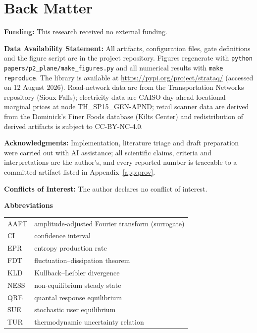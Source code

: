 \section*{Back Matter}
\small
\noindent\textbf{Funding:} This research received no external funding.

\noindent\textbf{Data Availability Statement:} All artifacts, configuration files, gate
definitions and the figure script are in the project repository. Figures regenerate with
\texttt{python papers/p2\_plane/make\_figures.py} and all numerical results with
\texttt{make reproduce}. The library is available at
\url{https://pypi.org/project/strataq/} (accessed on 12 August 2026). Road-network data are
from the Transportation Networks repository (Sioux Falls); electricity data are CAISO
day-ahead locational marginal prices at node TH\_SP15\_GEN-APND; retail scanner data are
derived from the Dominick's Finer Foods database (Kilts Center) and redistribution of
derived artifacts is subject to CC-BY-NC-4.0.

\noindent\textbf{Acknowledgments:} Implementation, literature triage and draft preparation
were carried out with AI assistance; all scientific claims, criteria and interpretations are
the author's, and every reported number is traceable to a committed artifact listed in
Appendix~\ref{app:prov}.

\noindent\textbf{Conflicts of Interest:} The author declares no conflict of interest.

\noindent\textbf{Abbreviations}
\begin{tabular}{ll}
AAFT & amplitude-adjusted Fourier transform (surrogate) \\
CI & confidence interval \\
EPR & entropy production rate \\
FDT & fluctuation--dissipation theorem \\
KLD & Kullback--Leibler divergence \\
NESS & non-equilibrium steady state \\
QRE & quantal response equilibrium \\
SUE & stochastic user equilibrium \\
TUR & thermodynamic uncertainty relation \\
\end{tabular}
\normalsize
